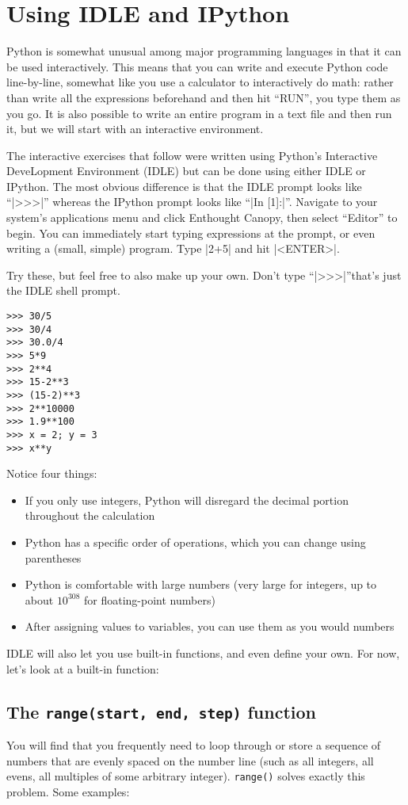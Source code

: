 \documentclass{article}
\begin{document}
\section{Using IDLE and IPython}
Python is somewhat unusual among major programming languages in that it can be used interactively.  This means that you can write and execute Python code line-by-line, somewhat like you use a calculator to interactively do math: rather than write all the expressions beforehand and then hit ``RUN'', you type them as you go.  It is also possible to write an entire program in a text file and then run it, but we will start with an interactive environment.

\pagebreak
The interactive exercises that follow were written using Python's Interactive DeveLopment Environment (IDLE) but can be done using either IDLE or IPython.  The most obvious difference is that the IDLE prompt looks like ``|>>>|'' whereas the IPython prompt looks like ``|In [1]:|''. Navigate to your system's applications menu and click Enthought Canopy, then select ``Editor'' to begin.  You can immediately start typing expressions at the prompt, or even writing a (small, simple)
program.  Type |2+5| and hit |<ENTER>|.

Try these, but feel free to also make up your own.  Don't type
``|>>>|''\textemdash that's just the IDLE shell prompt.
\begin{Verbatim}
>>> 30/5
>>> 30/4
>>> 30.0/4
>>> 5*9
>>> 2**4
>>> 15-2**3
>>> (15-2)**3
>>> 2**10000
>>> 1.9**100
>>> x = 2; y = 3
>>> x**y
\end{Verbatim}

Notice four things:
\begin{itemize}
 \item If you only use integers, Python will disregard the decimal portion throughout the calculation
 \item Python has a specific order of operations, which you can change using parentheses
 \item Python is comfortable with large numbers (very large for integers, up to
about $10^{308}$ for floating-point numbers)
 \item After assigning values to variables, you can use them as you would numbers
\end{itemize}

IDLE will also let you use built-in functions, and even define your own.  For
now, let's look at a built-in function:

\subsection{The \texttt{range(start, end, step)} function}
You will find that you frequently need to loop through or store a sequence
of numbers that are evenly spaced on the number line (such as all integers, all
evens, all multiples of some arbitrary integer).  \texttt{range()} solves exactly this problem.  Some examples:
\end{document}
